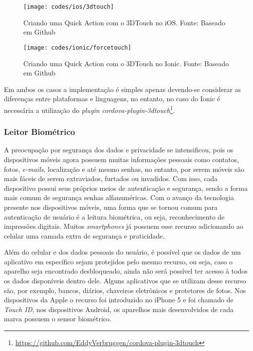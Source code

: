 \begin{figure}[H]
	\centering
	\texttt{[image: codes/ios/3dtouch]}
	\caption[Criando uma Quick Action com o 3DTouch no iOS.]{Criando uma Quick Action com o 3DTouch no iOS. Fonte: Baseado em Github\protect\footnotemark}
	\label{fig:3dtouch-ios}
\end{figure}


\begin{figure}[H]
	\centering
	\texttt{[image: codes/ionic/forcetouch]}
	\caption[Criando uma Quick Action com o 3DTouch no Ionic]{Criando uma Quick Action com o 3DTouch no Ionic. Fonte: Baseado em Github\protect\footnotemark}
	\label{fig:forcetouch-ionic}
\end{figure}


Em ambos os casos a implementação é simples apenas devendo-se considerar as diferenças entre plataformas e linguagens, no entanto, no caso do Ionic é necessária a utilização do 
\textit{plugin cordova-plugin-3dtouch}\footnote{\url{https://github.com/EddyVerbruggen/cordova-plugin-3dtouch}}. 

\subsubsection{Leitor Biométrico} \label{subsubsec:biometrico}
A preocupação por segurança dos dados e privacidade se intensificou, pois os dispositivos móveis agora possuem muitas informações pessoais como contatos, fotos, \textit{e-mails}, localização e até mesmo senhas, no entanto,
por serem móveis são mais fáceis de serem extraviados, furtados ou invadidos. Com isso, cada dispositivo possui seus próprios meios de autenticação e segurança, sendo a forma mais comum de segurança senhas alfanuméricas. 
Com o avanço da tecnologia presente nos dispositivos móveis, uma forma que se tornou comum para autenticação de usuário é a leitura biométrica, ou seja, reconhecimento de impressões digitais. Muitos \textit{smartphones} 
já possuem esse recurso adicionando ao celular uma camada extra de segurança e praticidade. 

Além do celular e dos dados pessoais do usuário, é possível que os dados de um aplicativo em específico sejam protejidos pelo mesmo recurso, ou seja, caso o aparelho seja encontrado desbloqueado, ainda não será possível 
ter acesso à todos os dados disponíveis dentro dele. Alguns aplicativos que se utilizam desse recurso são, por exemplo, bancos, diários, chaveiros eletrônicos e protetores de fotos. Nos dispositivos da Apple o recurso 
foi introduzido no iPhone 5 e foi chamado de \textit{Touch ID}, nos dispositivos Android, os aparelhos mais desenvolvidos de cada marca possuem o sensor biométrico. 


